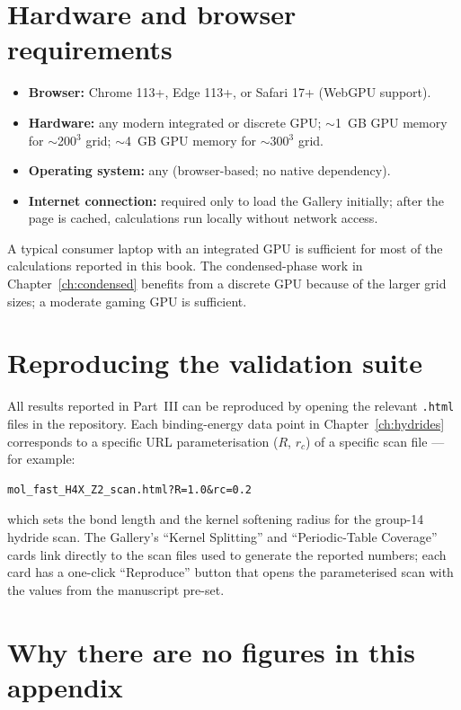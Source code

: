 \section{Hardware and browser requirements}\label{sec:requirements}

\begin{itemize}
\item \textbf{Browser:} Chrome 113+, Edge 113+, or Safari 17+ (WebGPU support).
\item \textbf{Hardware:} any modern integrated or discrete GPU; $\sim$1~GB GPU memory for $\sim$200$^3$ grid; $\sim$4~GB GPU memory for $\sim$300$^3$ grid.
\item \textbf{Operating system:} any (browser-based; no native dependency).
\item \textbf{Internet connection:} required only to load the Gallery initially; after the page is cached, calculations run locally without network access.
\end{itemize}

A typical consumer laptop with an integrated GPU is sufficient for most of the calculations reported in this book. The condensed-phase work in Chapter~\ref{ch:condensed} benefits from a discrete GPU because of the larger grid sizes; a moderate gaming GPU is sufficient.

\section{Reproducing the validation suite}\label{sec:reproducing}

All results reported in Part~III can be reproduced by opening the relevant \texttt{.html} files in the repository. Each binding-energy data point in Chapter~\ref{ch:hydrides} corresponds to a specific URL parameterisation ($R$, $r_c$) of a specific scan file --- for example:
\begin{verbatim}
mol_fast_H4X_Z2_scan.html?R=1.0&rc=0.2
\end{verbatim}
which sets the bond length and the kernel softening radius for the group-14 hydride scan. The Gallery's ``Kernel Splitting'' and ``Periodic-Table Coverage'' cards link directly to the scan files used to generate the reported numbers; each card has a one-click ``Reproduce'' button that opens the parameterised scan with the values from the manuscript pre-set.

\section{Why there are no figures in this appendix}\label{sec:no-figures}

